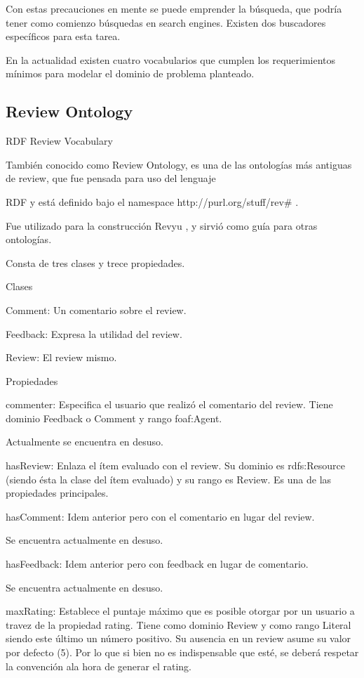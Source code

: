 Con estas precauciones en mente se puede emprender la búsqueda, que podría tener como comienzo búsquedas en  search engines. 
Existen dos buscadores específicos para esta tarea.

En la actualidad existen cuatro vocabularios que cumplen los requerimientos mínimos para modelar el dominio de problema planteado.

\subsection{Review Ontology}

RDF Review Vocabulary

También conocido como Review Ontology, es una de las ontologías más antiguas de review, que fue pensada para uso del lenguaje 

RDF y está definido bajo el namespace http://purl.org/stuff/rev\# .

Fue utilizado para la construcción Revyu , y sirvió como guía para otras ontologías.

Consta de tres clases y trece propiedades.

Clases

Comment: Un comentario sobre el review. 

Feedback: Expresa la utilidad del review. 


Review: El review mismo. 


Propiedades


commenter: Especifica el usuario que realizó el comentario del review. Tiene dominio Feedback o Comment y rango foaf:Agent.


Actualmente se encuentra en desuso.


hasReview: Enlaza el ítem evaluado con el review. Su dominio es rdfs:Resource (siendo ésta la clase del ítem evaluado) y su rango es Review. Es una de 
las propiedades principales. 


hasComment: Idem anterior pero con el comentario en lugar del review.

Se encuentra actualmente en desuso.

hasFeedback: Idem anterior pero con feedback en lugar de comentario.

Se encuentra actualmente en desuso.


maxRating: Establece el puntaje máximo que es posible otorgar por un usuario a travez de la propiedad rating. Tiene como dominio 
Review y como rango Literal siendo este último un número positivo. Su ausencia en un review asume su valor por defecto (5). Por lo que 
si bien no es indispensable que esté, se deberá respetar la convención ala hora de generar el rating.




